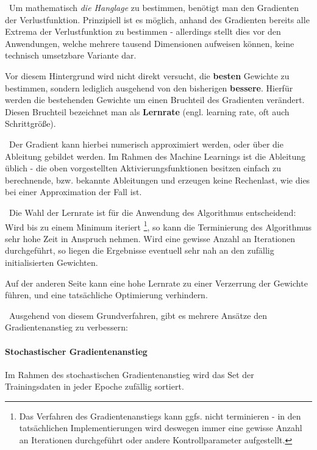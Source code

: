 ~\newline Um mathematisch \textit{die Hanglage} zu bestimmen, benötigt man den Gradienten der Verlustfunktion. Prinzipiell ist es möglich, anhand des Gradienten bereits alle Extrema der Verlustfunktion zu bestimmen - allerdings stellt dies vor den Anwendungen, welche mehrere tausend Dimensionen aufweisen können, keine technisch umsetzbare Variante dar. 

Vor diesem Hintergrund wird nicht direkt versucht, die \textbf{besten} Gewichte zu bestimmen, sondern lediglich ausgehend von den bisherigen \textbf{bessere}. Hierfür werden die bestehenden Gewichte um einen Bruchteil des Gradienten verändert. Diesen Bruchteil bezeichnet man als \textbf{Lernrate} (engl. learning rate, oft auch Schrittgröße).

~\newline Der Gradient kann hierbei numerisch approximiert werden, oder über die Ableitung gebildet werden. Im Rahmen des Machine Learnings ist die Ableitung üblich - die oben vorgestellten Aktivierungsfunktionen besitzen einfach zu berechnende, bzw. bekannte Ableitungen und erzeugen keine Rechenlast, wie dies bei einer Approximation der Fall ist.

~\newline Die Wahl der Lernrate ist für die Anwendung des Algorithmus entscheidend: Wird bis zu einem Minimum iteriert \footnote{Das Verfahren des Gradientenanstiegs kann ggfs. nicht terminieren - in den tatsächlichen Implementierungen wird deswegen immer eine gewisse Anzahl an Iterationen durchgeführt oder andere Kontrollparameter aufgestellt.}, so kann die Terminierung des Algorithmus sehr hohe Zeit in Anspruch nehmen. Wird eine gewisse Anzahl an Iterationen durchgeführt, so liegen die Ergebnisse eventuell sehr nah an den zufällig initialisierten Gewichten.

Auf der anderen Seite kann eine hohe Lernrate zu einer Verzerrung der Gewichte führen, und eine tatsächliche Optimierung verhindern.

~\newline Ausgehend von diesem Grundverfahren, gibt es mehrere Ansätze den Gradientenanstieg zu verbessern:

\paragraph{Stochastischer Gradientenanstieg}
Im Rahmen des stochastischen Gradientenanstieg wird das Set der Trainingsdaten in jeder Epoche zufällig sortiert. 

